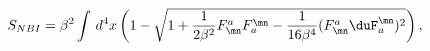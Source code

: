 \begin{equation}
  \label{eq:trbi}
  S_{NBI}=\beta^2\int\,d^4 x\left(1-\sqrt{1+\frac 1{2\beta^2}
  F^a_\mn F_a^\mn-\frac{1}{16\beta^4}(F^a_\mn
  \duF_a^\mn)^2}\right),
\end{equation}

